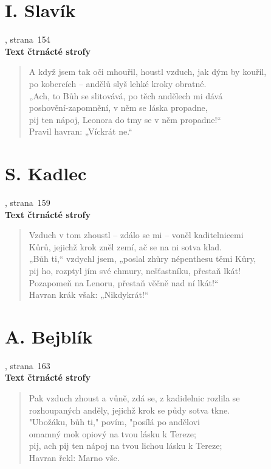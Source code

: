 \documentclass[dp.tex]{subfiles}
\begin{document}
\section*{I. Slavík}
, strana~154
\\\textbf{Text čtrnácté strofy}
\begin{samepage}
\begin{verse}
A když jsem tak oči mhouřil, houstl vzduch, jak dým by kouřil,\\
po kobercích -- andělů slyš lehké kroky obratné.\\
„Ach, to Bůh se slitovává, po těch andělech mi dává\\
poshovění-zapomnění, v něm se láska propadne,\\
pij ten nápoj, Leonora do tmy se v něm propadne!“\\
\hspace*{0.8cm}Pravil havran: „Víckrát ne.“
\end{verse}
\end{samepage}

\section*{S. Kadlec}
, strana~159
\\\textbf{Text čtrnácté strofy}
\begin{verse}
Vzduch v tom zhoustl -- zdálo se mi -- voněl kaditelnicemi\\
Kůrů, jejichž krok zněl zemí, ač se na ni sotva klad.\\
 „Bůh ti,“ vzdychl jsem,  „poslal zhůry népenthesu těmi Kůry,\\
pij ho, rozptyl jím své chmury, nešťastníku, přestaň lkát!\\
Pozapomeň na Lenoru, přestaň věčně nad ní lkát!“\\
\hspace*{0.8cm}Havran krák však: „Nikdykrát!“
\end{verse}

\section*{A. Bejblík}
, strana~163
\\\textbf{Text čtrnácté strofy}
\begin{verse}
Pak vzduch zhoust a vůně, zdá se, z kadidelnic rozlila se\\
rozhoupaných anděly, jejichž krok se půdy sotva tkne.\\
"Ubožáku, bůh ti," povím, "posílá po andělovi\\
omamný mok opiový na tvou lásku k Tereze;\\
pij, ach pij ten nápoj na tvou lichou lásku k Tereze;\\
Havran řekl: Marno vše.
\end{verse}
\end{document}
